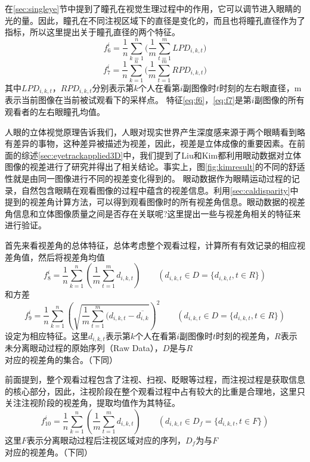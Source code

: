 在\ref{sec:singleye}节中提到了瞳孔在视觉生理过程中的作用，它可以调节进入眼睛的光的量。因此，瞳孔在不同注视区域下的直径是变化的，而且\parencite{zhang2014application}也将瞳孔直径作为了指标，所以这里提出关于瞳孔直径的两个特征。
\begin{equation}
\label{eq:f6}
{f_6^i} =\frac{1}{n}\sum\limits_{k = 1}^n {(\frac{1}{m}\sum\limits_{t = 1}^m {LP{D_{i,k,t}}} } )
\end{equation}
\begin{equation}
\label{eq:f7}
{f_7^i} = \frac{1}{n}\sum\limits_{k = 1}^n {(\frac{1}{m}\sum\limits_{t = 1}^m {RP{D_{i,k,t}}} } )
\end{equation}
其中${LP{D_{i,k,t}}}$，${RP{D_{i,k,t}}}$分别表示第$k$个人在看第$i$副图像时$t$时刻的左右眼直径，m表示当前图像在当前被试观看下的采样点。
特征\ref{eq:f6}，\ref{eq:f7}是第$i$副图像的所有观看者的左右眼瞳孔均值。

人眼的立体视觉原理告诉我们，人眼对现实世界产生深度感来源于两个眼睛看到略有差异的事物，这种差异被描述为视差，因此，视差是立体成像的重要因素。在前面的综述\ref{sec:eyetrackapplied3D}中，我们提到了Liu\parencite{liu2010dichotomy}和Kim\parencite{kim2014saliency}都利用眼动数据对立体图像的视差进行了研究并得出了相关结论。事实上，图\ref{fig:kimresult}的不同的舒适性就是由同一图像进行不同的视差变化得到的。
眼动数据作为眼睛运动过程的记录，自然包含眼睛在观看图像的过程中蕴含的视差信息。利用\ref{sec:caldisparity}中提到的视差角计算方法，可以得到观看图像时的所有视差角信息。眼动数据的视差角信息和立体图像质量之间是否存在关联呢?这里提出一些与视差角相关的特征来进行验证。

首先来看视差角的总体特征，总体考虑整个观看过程，计算所有有效记录的相应视差角值，然后将视差角均值
\begin{equation}
\label{eq:f8}
{f_8^i} =\frac{1}{n}\sum\limits_{k = 1}^n {(\frac{1}{m}\sum\limits_{t = 1}^m {{d_{i,k,t}}} )} \qquad({d_{i,k,t}} \in D = \{ {d_{i,k,t}},t \in R\} ) 
\end{equation}
和方差
\begin{equation}
\label{eq:f9}
{f_9^i} =\frac{1}{n}\sum\limits_{k = 1}^n {(\sqrt {\frac{1}{m}\sum\limits_{t = 1}^m {({d_{i,k,t}} - \overline {{d_{i,k}}} } } )^2}  \qquad({d_{i,k,t}} \in D = \{ {d_{i,k,t}},t \in R\} )
\end{equation}
设定为相应特征。这里${d_{i,k,t}}$表示第$k$个人在看第$i$副图像时$t$时刻的视差角，$R$表示未分离眼动过程的原始序列（Raw Data），$D$是与$R$对应的视差角的集合。（下同）

前面提到，整个观看过程包含了注视、扫视、眨眼等过程，而注视过程是获取信息的核心部分，因此，注视阶段在整个观看过程中占有较大的比重是合理地，这里只关注注视阶段的视差角，提取均值作为其特征。
\begin{equation}
\label{eq:f10}
{f_{10}^i} =\frac{1}{n}\sum\limits_{k = 1}^n {(\frac{1}{m}\sum\limits_{t = 1}^m {{d_{i,k,t}}} )}   \qquad({d_{i,k,t}} \in D_f = \{ {d_{i,k,t}},t \in F\} )
\end{equation}
这里$F$表示分离眼动过程后注视区域对应的序列，$D_f$为与$F$对应的视差角。（下同）

